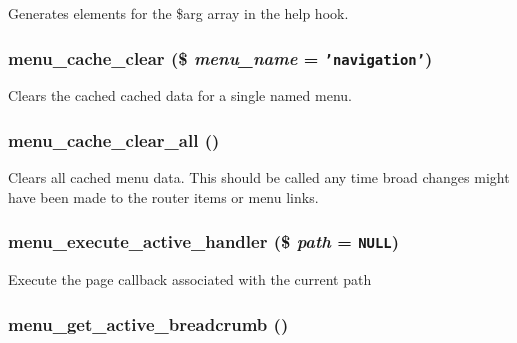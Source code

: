 Generates elements for the \$arg array in the help hook. \hypertarget{group__menu_g032d6b78c7deab10685ebfa6f32ad7eb}{
\subsubsection[{menu\_\-cache\_\-clear}]{\setlength{\rightskip}{0pt plus 5cm}menu\_\-cache\_\-clear (\$ {\em menu\_\-name} = {\tt 'navigation'})}}
\label{group__menu_g032d6b78c7deab10685ebfa6f32ad7eb}


Clears the cached cached data for a single named menu. \hypertarget{group__menu_g0a10fa44ca152a12091747e515b6a655}{
\subsubsection[{menu\_\-cache\_\-clear\_\-all}]{\setlength{\rightskip}{0pt plus 5cm}menu\_\-cache\_\-clear\_\-all ()}}
\label{group__menu_g0a10fa44ca152a12091747e515b6a655}


Clears all cached menu data. This should be called any time broad changes might have been made to the router items or menu links. \hypertarget{group__menu_gc2cef001e8197fecd49924e6e0e251c6}{
\subsubsection[{menu\_\-execute\_\-active\_\-handler}]{\setlength{\rightskip}{0pt plus 5cm}menu\_\-execute\_\-active\_\-handler (\$ {\em path} = {\tt NULL})}}
\label{group__menu_gc2cef001e8197fecd49924e6e0e251c6}


Execute the page callback associated with the current path \hypertarget{group__menu_g009731c4b3e736ebb620ba90e7f04207}{
\subsubsection[{menu\_\-get\_\-active\_\-breadcrumb}]{\setlength{\rightskip}{0pt plus 5cm}menu\_\-get\_\-active\_\-breadcrumb ()}}
\label{group__menu_g009731c4b3e736ebb620ba90e7f04207}


